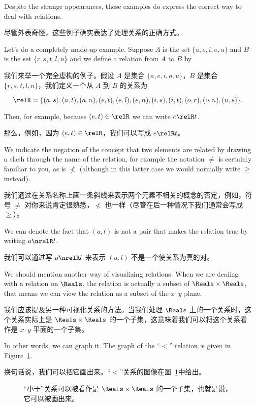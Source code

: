 Despite the strange appearances, these 
examples do express the correct way to deal with relations.

尽管外表奇怪，这些例子确实表达了处理关系的正确方式。

Let's do a completely made-up example.  Suppose $A$ is the set
$\{a,e,i,o,u\}$ and $B$ is the set $\{r,s,t,l,n\}$ and we define 
a relation from $A$ to $B$ by

我们来举一个完全虚构的例子。假设 $A$ 是集合 $\{a,e,i,o,u\}$，$B$ 是集合 $\{r,s,t,l,n\}$，我们定义一个从 $A$ 到 $B$ 的关系为

\[ \relR = \{ (a,s), (a,t), (a,n), (e,t), (e,l), (e,n), (i,s), (i,t), (o,r), (o,n), (u,s) \}.
\]

Then, for example, because $(e,t) \in \relR$ we can write $e \relR t$.

那么，例如，因为 $(e,t) \in \relR$，我们可以写成 $e \relR t$。

We indicate the
negation of the concept that two elements are related by drawing a slash 
through the name of the relation, for example the notation $\neq$ is certainly
familiar to you, as is $\nless$ (although in this latter case we 
would normally write $\geq$ instead).

我们通过在关系名称上画一条斜线来表示两个元素不相关的概念的否定，例如，符号 $\neq$ 对你来说肯定很熟悉，$\nless$ 也一样（尽管在后一种情况下我们通常会写成 $\geq$）。

We can denote the fact that
$(a,l)$ is not a pair that makes the relation true by writing $a \nrelR l$.

我们可以通过写 $a \nrelR l$ 来表示 $(a,l)$ 不是一个使关系为真的对。

We should mention another way of visualizing
relations.  When we are dealing with a relation on $\Reals$, the
relation is actually a subset of $\Reals \times \Reals$, that means 
we can view the relation as a subset of the $x$--$y$ plane.

我们应该提及另一种可视化关系的方法。当我们处理 $\Reals$ 上的一个关系时，这个关系实际上是 $\Reals \times \Reals$ 的一个子集，这意味着我们可以将这个关系看作是 $x$--$y$ 平面的一个子集。

In other 
words, we can graph it.  The graph of the ``$<$'' relation is
given in Figure~\ref{fig:lt_graph}.

换句话说，我们可以把它画出来。“$<$”关系的图像在图~\ref{fig:lt_graph}中给出。

\begin{figure}[!hbtp]
\begin{center}

\end{center}
\caption[The graph of the ``less than'' relation.]{The ``less than'' relation %
can be viewed as a subset of $\Reals \times \Reals$, i.e.\ it can be graphed.}
\caption[“小于”关系的图像。]{“小于”关系可以被看作是 $\Reals \times \Reals$ 的一个子集，也就是说，它可以被画出来。}
\label{fig:lt_graph} 
\end{figure}
  
